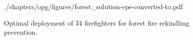 \begin{figure}[ht]
	\vspace*{-2mm}
	\begin{center}
		\begin{overpic}[width=0.7\textwidth,tics=5]{./chapters/opg/figures/forest_solution-eps-converted-to.pdf}
		\end{overpic}
	\end{center}
	\vspace*{-4.5mm}
	\caption{\label{fig:opg-forest}  Optimal deployment of $34$ firefighters for 
	forest fire rekindling prevention.}
	\vspace*{-3mm}
\end{figure}